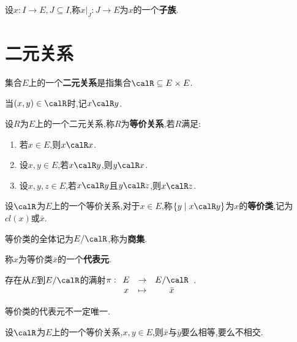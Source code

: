 \begin{deff}
    设$x: I \to E, J \subseteq I$,称$x \vert_J: J \to E$为$x$的一个\textbf{子族}.
\end{deff}

\section{二元关系}

\begin{deff}
    集合$E$上的一个\textbf{二元关系}是指集合$\calR \subseteq E \times E$.

    当$(x, y) \in \calR$时,记$x \calR y$.
\end{deff}

\begin{deff}
    设$R$为$E$上的一个二元关系,称$R$为\textbf{等价关系},若$R$满足:
    \begin{enumerate}
        \item 若$x \in E$,则$x \calR x$.
        \item 设$x, y \in E$,若$x \calR y$,则$y \calR x$.
        \item 设$x, y, z \in E$,若$x \calR y$且$y \calR z$,则$x \calR z$.
    \end{enumerate}
\end{deff}

\begin{deff}
    设$\calR$为$E$上的一个等价关系,对于$x \in E$,称$\{ y \mid x \calR y \}$为$x$的\textbf{等价类},记为$cl(x)$或$\bar{x}$.

    等价类的全体记为$E / \calR$,称为\textbf{商集}.

    称$x$为等价类$\bar{x}$的一个\textbf{代表元}.
\end{deff}

\begin{rqq}
    存在从$E$到$E / \calR$的满射$\pi: \begin{array}[t]{ccc} E & \to & E / \calR \\ x & \tp & \bar{x} \end{array}$.
\end{rqq}

\begin{rqq}
    等价类的代表元不一定唯一.
\end{rqq}

\begin{prop}
    设$\calR$为$E$上的一个等价关系,$x, y \in E$,则$\bar{x}$与$\bar{y}$要么相等,要么不相交.
\end{prop}

